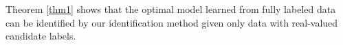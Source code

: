 \documentclass[letterpaper]{article} %
\begin{document}
Theorem \ref{thm1} shows that the optimal model learned from fully labeled data can be identified by our identification method given only data with real-valued candidate labels.
\end{document}
